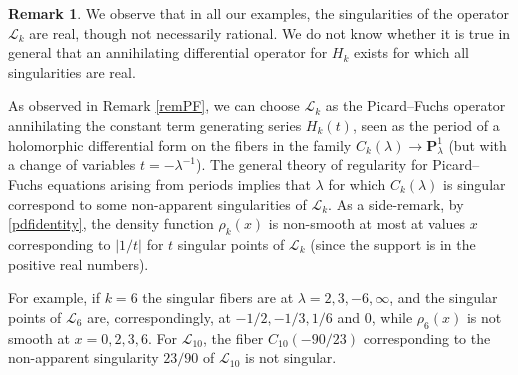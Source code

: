 \documentclass[12pt,reqno]{amsart}
\theoremstyle{definition}
\theoremstyle{plain}
\theoremstyle{definition}
\newtheorem{remark}[theorem]{Remark}
\newcommand{\PP}{\mathbf{P}}
\begin{document}
\begin{remark} \label{realsing} We observe that in all our examples, the singularities of the operator $\mathcal L_k$ are real, though not necessarily rational. We do not know whether it is true in general that an annihilating differential operator for $H_k$ exists for which all singularities are real. 

As observed in Remark \ref{remPF}, we can choose $\mathcal L_k$ as the Picard--Fuchs operator annihilating the constant term generating series $H_k(t)$, seen as the period of a holomorphic differential form on the fibers in the family $C_k(\lambda) \rightarrow \PP^1_\lambda$ (but with a change of variables $t=-\lambda^{-1}$). The general theory of regularity for Picard--Fuchs equations arising from periods \cite[\S 2]{vS} implies that $\lambda$ for which $C_k(\lambda)$ is singular correspond to some non-apparent singularities of $\mathcal L_k$. As a side-remark, by \eqref{pdfidentity}, the density function $\rho_k(x)$ is non-smooth at most at values $x$ corresponding to $|1/t|$ for $t$ singular points of $\mathcal L_k$ (since the support is in the positive real numbers). 

For example, if $k=6$ the singular fibers are at $\lambda=2,3,-6,\infty$, and the singular points of $\mathcal L_6$ are, correspondingly, at $-1/2,-1/3,1/6$ and $0$, while $\rho_6(x)$ is not smooth at $x=0,2,3,6$. For $\mathcal L_{10}$, the fiber $C_{10}(-90/23)$ corresponding to the non-apparent singularity $23/90$ of $\mathcal L_{10}$ is not singular.  
 
\end{remark} 
\end{document}
